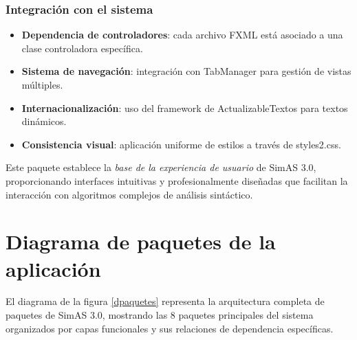 \subsubsection{Integración con el sistema}

\begin{itemize}
    \item \textbf{Dependencia de controladores}: cada archivo FXML está asociado a una clase controladora específica.
    \item \textbf{Sistema de navegación}: integración con TabManager para gestión de vistas múltiples.
    \item \textbf{Internacionalización}: uso del framework de ActualizableTextos para textos dinámicos.
    \item \textbf{Consistencia visual}: aplicación uniforme de estilos a través de styles2.css.
\end{itemize}

Este paquete establece la \textit{base de la experiencia de usuario} de SimAS 3.0, proporcionando interfaces intuitivas y profesionalmente diseñadas que facilitan la interacción con algoritmos complejos de análisis sintáctico.

 \section{Diagrama de paquetes de la aplicación}

El diagrama de la figura \ref{dpaquetes} representa la arquitectura completa de paquetes de SimAS 3.0, mostrando las 8 paquetes principales del sistema organizados por capas funcionales y sus relaciones de dependencia específicas.

